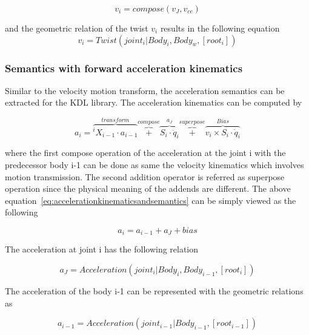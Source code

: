 \begin{equation}
v_i = compose(v_J, v_{cc})
\end{equation}

and the geometric relation of the twist $v_i$ results in the following equation
\begin{equation}
v_i = Twist(joint_i | Body_i, Body_w, [root_i])
\end{equation}

\subsubsection*{Semantics with forward acceleration kinematics}

Similar to the velocity motion transform, the acceleration semantics can be extracted for the KDL library. The acceleration kinematics can be computed by

\begin{equation}
a_i = \overbrace{^iX_{i-1}\cdot a_{i-1}}^{transform} \overbrace{+}^{compose} \overbrace{S_i\cdot \ddot{q}_i}^{a_J} \overbrace{+}^{superpose}  \overbrace{v_i \times S_i\cdot \dot{q}_i}^{Bias}
\label{eq:accelerationkinematicsandsemantics}
\end{equation}

where the first compose operation of the acceleration at the joint i with the predecessor body i-1 can be done as same the velocity kinematics which involves motion transmission. The second addition operator is referred as superpose operation since the physical meaning of the addends are different. The above equation~\ref{eq:accelerationkinematicsandsemantics} can be simply viewed as the following 

\begin{equation}
a_i = a_{i-1} + a_J + bias
\label{eq:simplifiedacceleration}
\end{equation}

The acceleration at joint i has the following relation

\begin{equation}
a_J = Acceleration(joint_i | Body_i, Body_{i-1}, [root_i])
\end{equation}

The acceleration of the body i-1 can be represented with the geometric relations as

\begin{equation}
a_{i-1} = Acceleration(joint_{i-1} | Body_{i-1}, [root_{i-1}])
\end{equation}


